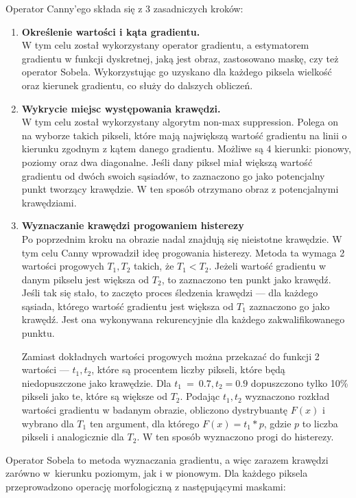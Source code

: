 \documentclass[a4paper,11pt,twoside,openright]{report}
\theoremstyle{definition}
\begin{document}
Operator Canny'ego \cite{Canny} składa się z 3 zasadniczych kroków:
\begin{enumerate}%
\item \textbf {Określenie wartości i kąta gradientu.} \\
W tym celu został wykorzystany operator gradientu, a estymatorem gradientu w
funkcji dyskretnej, jaką jest obraz, zastosowano maskę, czy też operator Sobela.
Wykorzystując go uzyskano dla każdego piksela wielkość oraz kierunek gradientu,
co służy do dalszych obliczeń.
\item \textbf {Wykrycie miejsc występowania krawędzi.} \\
W tym celu został wykorzystany algorytm non-max suppression. Polega on na wyborze
takich pikseli, które mają największą wartość gradientu na linii o kierunku
zgodnym z kątem danego gradientu. Możliwe są 4 kierunki: pionowy, poziomy oraz
dwa diagonalne. Jeśli dany piksel miał większą wartość gradientu od dwóch swoich
sąsiadów, to zaznaczono go jako potencjalny punkt tworzący krawędzie. W ten sposób
otrzymano obraz z potencjalnymi krawędziami.
\item \textbf {Wyznaczanie krawędzi progowaniem histerezy} \\
Po poprzednim kroku na obrazie nadal znajdują się nieistotne krawędzie. W tym celu
Canny wprowadził ideę progowania histerezy. Metoda ta wymaga 2 wartości progowych
$T_1, T_2$ takich, że $T_1 < T_2$. Jeżeli wartość gradientu w danym pikselu jest
większa od $T_2$, to zaznaczono ten punkt jako krawędź. Jeśli tak się stało, to
zaczęto proces śledzenia krawędzi --- dla każdego sąsiada, którego wartość gradientu
jest większa od $T_1$ zaznaczono go jako krawędź. Jest ona wykonywana rekurencyjnie
dla każdego zakwalifikowanego punktu.

Zamiast dokładnych wartości progowych można przekazać do funkcji 2 wartości ---
$t_1, t_2$, które są procentem liczby pikseli, które będą niedopuszczone jako
krawędzie. Dla $t_1~=~0.7, t_2 = 0.9$ dopuszczono tylko 10\% pikseli jako te,
które są większe od $T_2$. Podając $t_1, t_2$ wyznaczono rozkład wartości
gradientu w badanym obrazie, obliczono dystrybuantę $F(x)$ i wybrano dla $T_1$
ten argument, dla którego $F(x) = t_1 * p$, gdzie $p$ to liczba pikseli i analogicznie
dla $T_2$. W ten sposób wyznaczono progi do histerezy.

\end{enumerate}

Operator Sobela \cite{Sobel} to metoda wyznaczania gradientu, a więc zarazem
krawędzi zarówno w~kierunku poziomym, jak i w pionowym. Dla każdego piksela
przeprowadzono operację morfologiczną z następującymi maskami:
\end{document}
